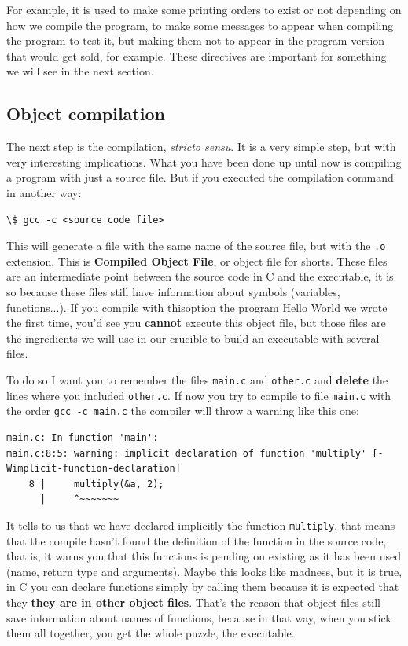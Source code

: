 \documentclass[a4paper]{article}
\begin{document}
For example, it is used to make some printing orders to exist or not depending
on how we compile the program, to make some messages to appear when compiling
the program to test it, but making them not to appear in the program version
that would get sold, for example. These directives are important for something
we will see in the next section.

\subsection{Object compilation}
The next step is the compilation, \textit{stricto sensu}. It is a very simple
step, but with very interesting implications. What you have been done up until
now is compiling a program with just a source file. But if you executed the
compilation command in another way:
\begin{lstlisting}[style=terminalStyle]
\$ gcc -c <source code file>
\end{lstlisting}

This will generate a file with the same name of the source file, but with the
\verb!.o! extension. This is \textbf{Compiled Object File}, or object file for
shorts. These files are an intermediate point between the source code in C and
the executable, it is so because these files still have information about
symbols (variables, functions...). If you compile with thisoption the program
Hello World we wrote the first time, you'd see you \textbf{cannot} execute
this object file, but those files are the ingredients we will use in our
crucible to build an executable with several files.

To do so I want you to remember the files \verb!main.c! and \verb!other.c! and
\textbf{delete} the lines where you included \verb!other.c!. If now you try to
compile to file \verb!main.c! with the order \verb!gcc -c main.c! the compiler
will throw a warning like this one:

\begin{lstlisting}[style=terminalStyle]
main.c: In function 'main':
main.c:8:5: warning: implicit declaration of function 'multiply' [-Wimplicit-function-declaration]
    8 |     multiply(&a, 2);
      |     ^~~~~~~~
\end{lstlisting}

It tells to us that we have declared implicitly the function \verb!multiply!,
that means that the compile hasn't found the definition of the function in the
source code, that is, it warns you that this functions is pending on existing
as it has been used (name, return type and arguments). Maybe this looks like
madness, but it is true, in C you can declare functions simply by calling them
because it is expected that they \textbf{they are in other object files}.
That's the reason that object files still save information about names of
functions, because in that way, when you stick them all together, you get
the whole puzzle, the executable.
\end{document}
